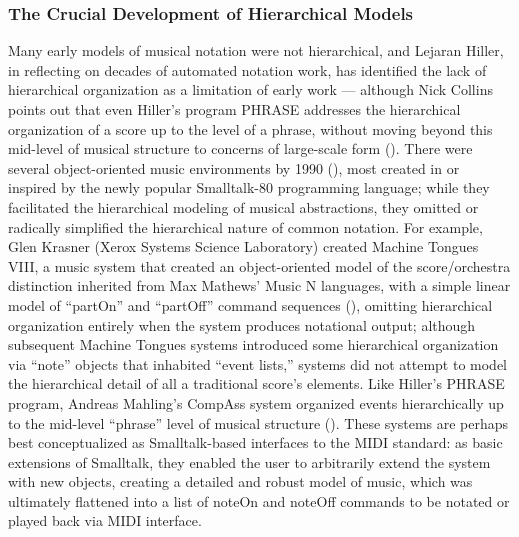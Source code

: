 \subsubsection{The Crucial Development of Hierarchical Models}
Many early models of musical notation were not hierarchical, and Lejaran Hiller, in reflecting on decades of automated notation work, has identified the lack of hierarchical organization as a limitation of early work --- although Nick Collins points out that even Hiller's program PHRASE addresses the hierarchical organization of a score up to the level of a phrase, without moving beyond this mid-level of musical structure to concerns of large-scale form (\cite[108]{Collins2009}). There were several object-oriented music environments by 1990 (\cite[139]{Polansky:1990fk}), most created in or inspired by the newly popular Smalltalk-80 programming language; while they facilitated the hierarchical modeling of musical abstractions, they omitted or radically simplified the hierarchical nature of common notation. For example, Glen Krasner (Xerox Systems Science Laboratory) created Machine Tongues VIII, a music system that created an object-oriented model of the score/orchestra distinction inherited from Max Mathews' Music N languages, with a simple linear model of ``partOn'' and ``partOff'' command sequences (\cite{Krasner:1991uq}), omitting hierarchical organization entirely when the system produces notational output; although subsequent Machine Tongues systems introduced some hierarchical organization via ``note'' objects that inhabited ``event lists,'' systems did not attempt to model the hierarchical detail of all a traditional score's elements. Like Hiller's PHRASE program, Andreas Mahling's CompAss system organized events hierarchically up to the mid-level ``phrase'' level of musical structure (\cite{Mahling:1991qf}). These systems are perhaps best conceptualized as Smalltalk-based interfaces to the MIDI standard: as basic extensions of Smalltalk, they enabled the user to arbitrarily extend the system with new objects, creating a detailed and robust model of music, which was ultimately flattened into a list of noteOn and noteOff commands to be notated or played back via MIDI interface. 

